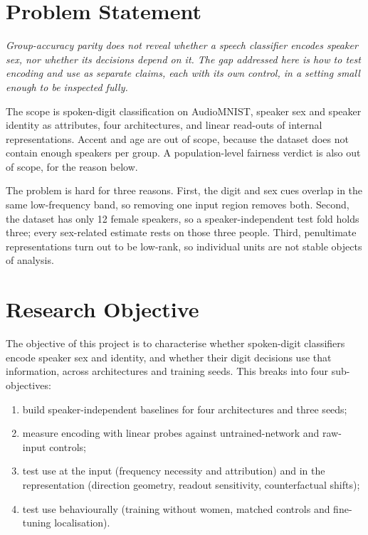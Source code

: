 \documentclass[conference]{IEEEtran}
\begin{document}
\section{Problem Statement}\label{sec:problem}

\emph{Group-accuracy parity does not reveal whether a speech classifier
encodes speaker sex, nor whether its decisions depend on it. The gap
addressed here is how to test encoding and use as separate claims, each with
its own control, in a setting small enough to be inspected fully.}

The scope is spoken-digit classification on AudioMNIST, speaker sex and
speaker identity as attributes, four architectures, and linear read-outs of
internal representations. Accent and age are out of scope, because the
dataset does not contain enough speakers per group. A population-level
fairness verdict is also out of scope, for the reason below.

The problem is hard for three reasons. First, the digit and sex cues overlap
in the same low-frequency band, so removing one input region removes both.
Second, the dataset has only 12 female speakers, so a speaker-independent
test fold holds three; every sex-related estimate rests on those three
people. Third, penultimate representations turn out to be low-rank, so
individual units are not stable objects of analysis.

\section{Research Objective}\label{sec:objective}

The objective of this project is to characterise whether spoken-digit
classifiers encode speaker sex and identity, and whether their digit
decisions use that information, across architectures and training seeds.
This breaks into four sub-objectives:
\begin{enumerate}
  \item build speaker-independent baselines for four architectures and three seeds;
  \item measure encoding with linear probes against untrained-network and raw-input controls;
  \item test use at the input (frequency necessity and attribution) and in the
        representation (direction geometry, readout sensitivity, counterfactual shifts);
  \item test use behaviourally (training without women, matched controls and
        fine-tuning localisation).
\end{enumerate}
\end{document}
